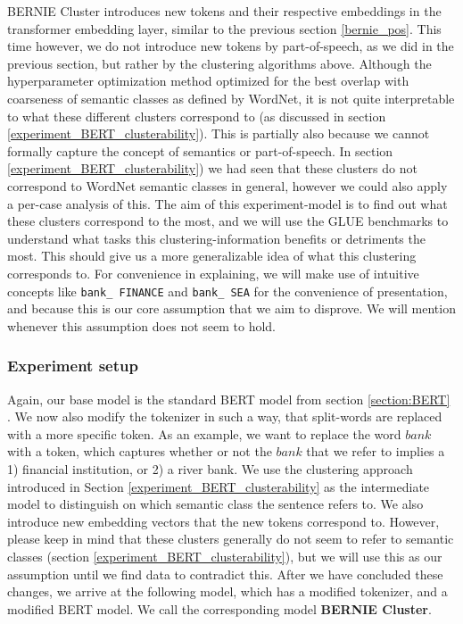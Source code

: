 \documentclass[a4paper,12pt,oneside,openright]{report}
\begin{document}
BERNIE Cluster introduces new tokens and their respective embeddings in the transformer embedding layer, similar to the previous section \ref{bernie_pos}.
This time however, we do not introduce new tokens by part-of-speech, as we did in the previous section, but rather by the clustering algorithms above.
Although the hyperparameter optimization method optimized for the best overlap with coarseness of semantic classes as defined by WordNet, it is not quite interpretable to what these different clusters correspond to (as discussed in section  \ref{experiment_BERT_clusterability}).
This is partially also because we cannot formally capture the concept of semantics or part-of-speech.
In section \ref{experiment_BERT_clusterability}) we had seen that these clusters do not correspond to WordNet semantic classes in general, however we could also apply a per-case analysis of this.
The aim of this experiment-model is to find out what these clusters correspond to the most, and we will use the GLUE benchmarks to understand what tasks this clustering-information benefits or detriments the most.
This should give us a more generalizable idea of what this clustering corresponds to.
For convenience in explaining, we will make use of intuitive concepts like \texttt{bank\_ FINANCE} and \texttt{bank\_ SEA} for the convenience of presentation, and because this is our core assumption that we aim to disprove.
We will mention whenever this assumption does not seem to hold.

\subsubsection{Experiment setup}

Again, our base model is the standard BERT model from section \ref{section:BERT} .
We now also modify the tokenizer in such a way, that split-words are replaced with a more specific token.
As an example, we want to replace the word $bank$ with a token, which captures whether or not the $bank$ that we refer to implies a 1) financial institution, or 2) a river bank.
We use the clustering approach introduced in Section \ref{experiment_BERT_clusterability} as the intermediate model to distinguish on which semantic class the sentence refers to.
We also introduce new embedding vectors that the new tokens correspond to.
However, please keep in mind that these clusters generally do not seem to refer to semantic classes (section \ref{experiment_BERT_clusterability}), but we will use this as our assumption until we find data to contradict this.
After we have concluded these changes, we arrive at the following model, which has a modified tokenizer, and a modified BERT model.
We call the corresponding model \textbf{BERNIE Cluster}.
\end{document}
